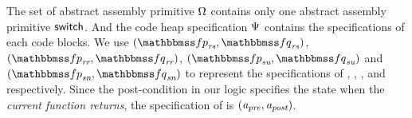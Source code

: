 The set of abstract assembly primitive $\Omega$ 
contains only one abstract assembly primitive $\mathsf{switch}$. 
And the code heap specification $\Psi{}$
contains the specifications of each code blocks. 
We use 
$(\relspecpre_{\textit{rs}}, \relspecpost_{\textit{rs}})$, 
$(\relspecpre_{\textit{rr}}, \relspecpost_{\textit{rr}})$, 
$(\relspecpre_{\textit{su}}, \relspecpost_{\textit{su}})$ and
$(\relspecpre_{\textit{sn}}, \relspecpost_{\textit{sn}})$
to represent the specifications of 
\SwitchEntry{}, \regsave{}, \regrestore{}, 
\SaveUsedWin{} and \SwitchNewTask{} respectively. 
Since the post-condition in our logic specifies the 
state when the \textit{current function returns}, 
the specification of \SwitchEntry{} is $(\textit{a}_\textit{pre}, \textit{a}_\textit{post})$.

